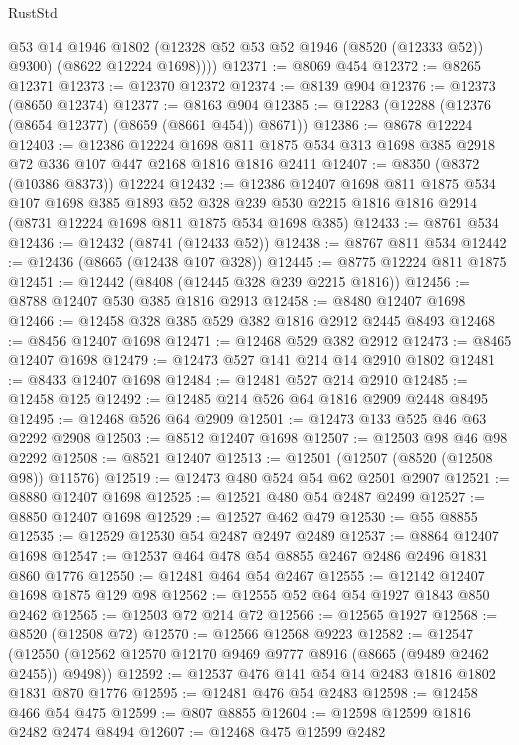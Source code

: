 \begin{lexlean}{RustStd}
\begin{coremodule}
          @53
          @14
          @1946
          @1802
          (@12328 @52 @53 @52 @1946 (@8520 (@12333 @52)) @9300)
          (@8622 @12224 @1698))))
@12371 := @8069 @454
@12372 := @8265 @12371
@12373 := @12370 @12372
@12374 := @8139 @904
@12376 := @12373 (@8650 @12374)
@12377 := @8163 @904
@12385 := @12283 (@12288 (@12376 (@8654 @12377) (@8659 (@8661 @454)) @8671))
@12386 := @8678 @12224
@12403 := @12386
    @12224
    @1698
    @811
    @1875
    @534
    @313
    @1698
    @385
    @2918
    @72
    @336
    @107
    @447
    @2168
    @1816
    @1816
    @2411
@12407 := @8350 (@8372 (@10386 @8373)) @12224
@12432 := @12386
    @12407
    @1698
    @811
    @1875
    @534
    @107
    @1698
    @385
    @1893
    @52
    @328
    @239
    @530
    @2215
    @1816
    @1816
    @2914
    (@8731 @12224 @1698 @811 @1875 @534 @1698 @385)
@12433 := @8761 @534
@12436 := @12432 (@8741 (@12433 @52))
@12438 := @8767 @811 @534
@12442 := @12436 (@8665 (@12438 @107 @328))
@12445 := @8775 @12224 @811 @1875
@12451 := @12442 (@8408 (@12445 @328 @239 @2215 @1816))
@12456 := @8788 @12407 @530 @385 @1816 @2913
@12458 := @8480 @12407 @1698
@12466 := @12458 @328 @385 @529 @382 @1816 @2912 @2445 @8493
@12468 := @8456 @12407 @1698
@12471 := @12468 @529 @382 @2912
@12473 := @8465 @12407 @1698
@12479 := @12473 @527 @141 @214 @14 @2910 @1802
@12481 := @8433 @12407 @1698
@12484 := @12481 @527 @214 @2910
@12485 := @12458 @125
@12492 := @12485 @214 @526 @64 @1816 @2909 @2448 @8495
@12495 := @12468 @526 @64 @2909
@12501 := @12473 @133 @525 @46 @63 @2292 @2908
@12503 := @8512 @12407 @1698
@12507 := @12503 @98 @46 @98 @2292
@12508 := @8521 @12407
@12513 := @12501 (@12507 (@8520 (@12508 @98)) @11576)
@12519 := @12473 @480 @524 @54 @62 @2501 @2907
@12521 := @8880 @12407 @1698
@12525 := @12521 @480 @54 @2487 @2499
@12527 := @8850 @12407 @1698
@12529 := @12527 @462 @479
@12530 := @55 @8855
@12535 := @12529 @12530 @54 @2487 @2497 @2489
@12537 := @8864 @12407 @1698
@12547 := @12537 @464 @478 @54 @8855 @2467 @2486 @2496 @1831 @860 @1776
@12550 := @12481 @464 @54 @2467
@12555 := @12142 @12407 @1698 @1875 @129 @98
@12562 := @12555 @52 @64 @54 @1927 @1843 @850 @2462
@12565 := @12503 @72 @214 @72
@12566 := @12565 @1927
@12568 := @8520 (@12508 @72)
@12570 := @12566 @12568 @9223
@12582 := @12547 (@12550 (@12562 @12570 @12170 @9469 @9777 @8916 (@8665 (@9489 @2462 @2455)) @9498))
@12592 := @12537 @476 @141 @54 @14 @2483 @1816 @1802 @1831 @870 @1776
@12595 := @12481 @476 @54 @2483
@12598 := @12458 @466 @54 @475
@12599 := @807 @8855
@12604 := @12598 @12599 @1816 @2482 @2474 @8494
@12607 := @12468 @475 @12599 @2482

\end{coremodule}
\end{lexlean}
